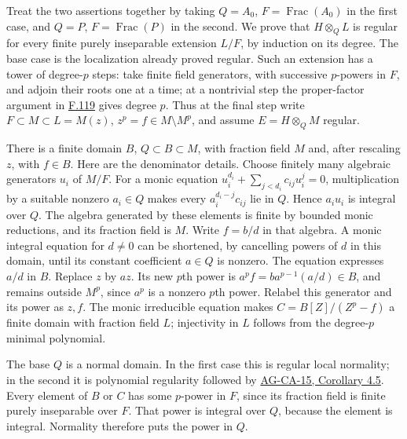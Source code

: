 \documentclass[11pt,a4paper,openany]{report}
\begin{document}
Treat the two assertions together by taking \(Q=A_0\), \(F=\operatorname{Frac}(A_0)\) in the first case, and \(Q=P\), \(F=\operatorname{Frac}(P)\) in the second. We prove that \(H\otimes_Q L\) is regular for every finite purely inseparable extension \(L/F\), by induction on its degree. The base case is the localization already proved regular. Such an extension has a tower of degree-\(p\) steps: take finite field generators, with successive \(p\)-powers in \(F\), and adjoin their roots one at a time; at a nontrivial step the proper-factor argument in \hyperref[AG-RG-S05-more-algebra-lemma-p-basis]{F.119} gives degree \(p\). Thus at the final step write \(F\subset M\subset L=M(z)\), \(z^p=f\in M\setminus M^p\), and assume \(E=H\otimes_QM\) regular.

There is a finite domain \(B\), \(Q\subset B\subset M\), with fraction field \(M\) and, after rescaling \(z\), with \(f\in B\). Here are the denominator details. Choose finitely many algebraic generators \(u_i\) of \(M/F\). For a monic equation \(u_i^{d_i}+\sum_{j<d_i}c_{ij}u_i^j=0\), multiplication by a suitable nonzero \(a_i\in Q\) makes every \(a_i^{d_i-j}c_{ij}\) lie in \(Q\). Hence \(a_iu_i\) is integral over \(Q\). The algebra generated by these elements is finite by bounded monic reductions, and its fraction field is \(M\). Write \(f=b/d\) in that algebra. A monic integral equation for \(d\ne0\) can be shortened, by cancelling powers of \(d\) in this domain, until its constant coefficient \(a\in Q\) is nonzero. The equation expresses \(a/d\) in \(B\). Replace \(z\) by \(az\). Its new \(p\)th power is \(a^pf=b a^{p-1}(a/d)\in B\), and remains outside \(M^p\), since \(a^p\) is a nonzero \(p\)th power. Relabel this generator and its power as \(z,f\). The monic irreducible equation makes \(C=B[Z]/(Z^p-f)\) a finite domain with fraction field \(L\); injectivity in \(L\) follows from the degree-\(p\) minimal polynomial.

The base \(Q\) is a normal domain. In the first case this is regular local normality; in the second it is polynomial regularity followed by \href{https://github.com/KokunoYumeto/open-math-courses/blob/d02d0a3669f42579db037cd44de1d113fdd770a1/docs/courses/AG-CA/src/discrete-valuation-rings-normal-rings-and-serres-criterion.md}{AG-CA-15, Corollary 4.5}. Every element of \(B\) or \(C\) has some \(p\)-power in \(F\), since its fraction field is finite purely inseparable over \(F\). That power is integral over \(Q\), because the element is integral. Normality therefore puts the power in \(Q\).
\end{document}
